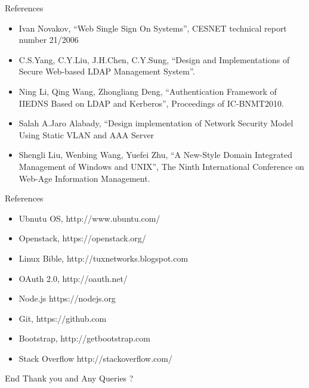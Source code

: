 \documentclass[10pt,xcolor=dvipsnames]{beamer}
\begin{document}
\begin{frame}{References}
\small
\begin{itemize}
\item Ivan Novakov, ``Web Single Sign On Systems'', CESNET technical report number 21/2006
\item C.S.Yang, C.Y.Liu, J.H.Chen, C.Y.Sung, ``Design and Implementations of Secure Web-based LDAP Management System''.
\item Ning Li, Qing Wang, Zhongliang Deng, ``Authentication Framework of IIEDNS Based on LDAP and Kerberos'', Proceedings of IC-BNMT2010.
\item Salah A.Jaro Alabady, ``Design implementation of Network Security Model Using Static VLAN and AAA Server
\item Shengli Liu, Wenbing Wang, Yuefei Zhu, ``A New-Style Domain Integrated Management of Windows and UNIX'', The Ninth International Conference on Web-Age Information Management.
\end{itemize}
\end{frame}

\begin{frame}{References}
\small
\begin{itemize}
\item Ubnutu OS, http://www.ubuntu.com/
\item Openstack, https://openstack.org/
\item Linux Bible, http://tuxnetworks.blogspot.com
\item OAuth 2.0, http://oauth.net/
\item Node.js https://nodejs.org
\item Git, https://github.com
\item Bootstrap, http://getbootstrap.com 
\item Stack Overflow http://stackoverflow.com/
\end{itemize}
\end{frame}

\begin{frame}{End}
Thank you and Any Queries ?
\end{frame}
\end{document}
